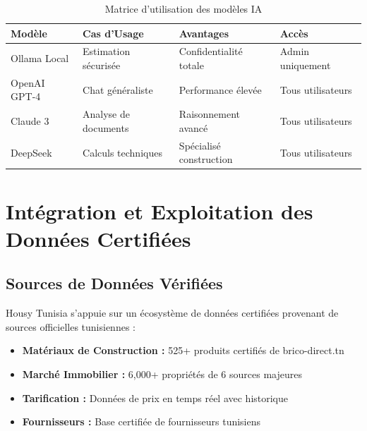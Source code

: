 \begin{table}[H]
\centering
\caption{Matrice d'utilisation des modèles IA}
\begin{tabular}{|l|l|l|l|}
\hline
\textbf{Modèle} & \textbf{Cas d'Usage} & \textbf{Avantages} & \textbf{Accès} \\
\hline
Ollama Local & Estimation sécurisée & Confidentialité totale & Admin uniquement \\
\hline
OpenAI GPT-4 & Chat généraliste & Performance élevée & Tous utilisateurs \\
\hline
Claude 3 & Analyse de documents & Raisonnement avancé & Tous utilisateurs \\
\hline
DeepSeek & Calculs techniques & Spécialisé construction & Tous utilisateurs \\
\hline
\end{tabular}
\label{tab:matrice_ia}
\end{table}


\section{Intégration et Exploitation des Données Certifiées}

\subsection{Sources de Données Vérifiées}

Housy Tunisia s'appuie sur un écosystème de données certifiées provenant de sources officielles tunisiennes :

\begin{itemize}
    \item \textbf{Matériaux de Construction :} 525+ produits certifiés de brico-direct.tn
    \item \textbf{Marché Immobilier :} 6,000+ propriétés de 6 sources majeures
    \item \textbf{Tarification :} Données de prix en temps réel avec historique
    \item \textbf{Fournisseurs :} Base certifiée de fournisseurs tunisiens
\end{itemize}


